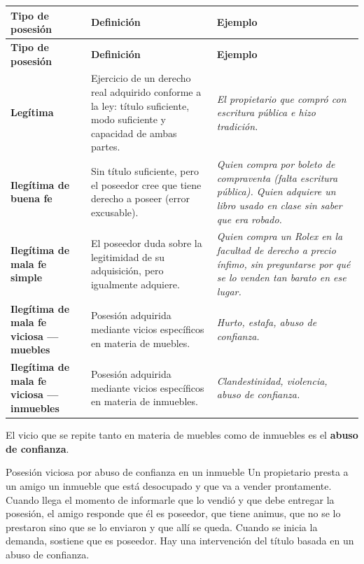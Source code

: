 \documentclass[12pt,oneside]{book}
\begin{document}
\begin{longtable}{
    >{\raggedright\arraybackslash}p{}
    >{\raggedright\arraybackslash}p{}
    >{\raggedright\arraybackslash}p{}
}
\toprule
\textbf{Tipo de posesión} & \textbf{Definición} & \textbf{Ejemplo} \\
\midrule
\endfirsthead
\toprule
\textbf{Tipo de posesión} & \textbf{Definición} & \textbf{Ejemplo} \\
\midrule
\endhead
\textbf{Legítima} &
Ejercicio de un derecho real adquirido conforme a la ley: título suficiente, modo suficiente y capacidad de ambas partes. &
\textit{El propietario que compró con escritura pública e hizo tradición.} \\
\midrule
\textbf{Ilegítima de buena fe} &
Sin título suficiente, pero el poseedor cree que tiene derecho a poseer (error excusable). &
\textit{Quien compra por boleto de compraventa (falta escritura pública). Quien adquiere un libro usado en clase sin saber que era robado.} \\
\midrule
\textbf{Ilegítima de mala fe simple} &
El poseedor duda sobre la legitimidad de su adquisición, pero igualmente adquiere. &
\textit{Quien compra un Rolex en la facultad de derecho a precio ínfimo, sin preguntarse por qué se lo venden tan barato en ese lugar.} \\
\midrule
\textbf{Ilegítima de mala fe viciosa --- muebles} &
Posesión adquirida mediante vicios específicos en materia de muebles. &
\textit{Hurto, estafa, abuso de confianza.} \\
\midrule
\textbf{Ilegítima de mala fe viciosa --- inmuebles} &
Posesión adquirida mediante vicios específicos en materia de inmuebles. &
\textit{Clandestinidad, violencia, abuso de confianza.} \\
\bottomrule
\end{longtable}

El vicio que se repite tanto en materia de muebles como de inmuebles es el \textbf{abuso de confianza}.

\begin{example}{Posesión viciosa por abuso de confianza en un inmueble}
Un propietario presta a un amigo un inmueble que está desocupado y que va a vender prontamente. Cuando llega el momento de informarle que lo vendió y que debe entregar la posesión, el amigo responde que él es poseedor, que tiene animus, que no se lo prestaron sino que se lo enviaron y que allí se queda. Cuando se inicia la demanda, sostiene que es poseedor. Hay una intervención del título basada en un abuso de confianza.
\end{example}
\end{document}
